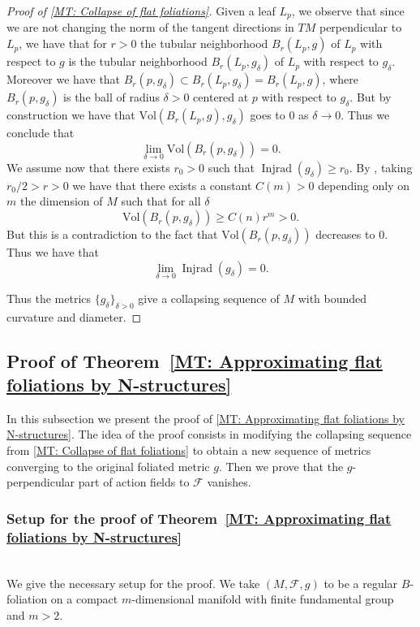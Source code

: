 \documentclass[12pt,a4paper,reqno]{amsart}
\theoremstyle{definition}
\numberwithin{equation}{section}
\newcommand{\fol}{\mathcal{F}}
\DeclareMathOperator{\Inj}{Injrad}
\begin{document}
\begin{proof}[Proof of \th\ref{MT: Collapse of flat foliations}]
Given a leaf $L_p$, we observe that since we are not changing the norm of the tangent directions in $TM$ perpendicular to $L_p$, we have that for $r>0$ the tubular neighborhood $B_{r}(L_p,g)$ of $L_p$ with respect to $g$ is the tubular neighborhood $B_{r}(L_p,g_\delta)$ of $L_p$ with respect to $g_\delta$. Moreover we have that  $B_{r}(p,g_\delta)\subset B_{r}(L_p,g_\delta)= B_{r}(L_p,g)$, where $B_{r}(p,g_\delta)$ is the ball of radius $\delta>0$ centered at $p$ with respect to $g_\delta$. But by construction we have that $\mathrm{Vol}(B_{r}(L_p,g), g_\delta)$ goes to $0$ as $\delta\to 0$. Thus we conclude that 
\[
\lim_{\delta\to 0}\mathrm{Vol}(B_{r}(p,g_\delta)) =0.
\]
We assume now that there exists $r_0>0$ such that $\Inj(g_\delta)\geq r_0$. By \cite[Proposition 14]{Croke1980}, taking $r_0/2>r>0$ we have that there exists a constant $C(m)>0$ depending only on $m$ the dimension of $M$ such that for all $\delta$
\[
\mathrm{Vol}(B_{r}(p,g_\delta))\geq C(n) r^m>0.
\] 
But this is a contradiction to the fact that $\mathrm{Vol}(B_{r}(p,g_\delta))$ decreases to $0$. Thus  we have that 
\[
\lim_{\delta\to 0} \Inj(g_\delta)=0.
\]

Thus the metrics $\{g_\delta\}_{\delta>0}$ give a collapsing sequence of $M$ with bounded curvature and diameter.
\end{proof}

\subsection{Proof of Theorem~\ref{MT: Approximating flat foliations by N-structures}}\label{SS: Proof of approximation by N-structures}

In this subsection we present the proof of \th\ref{MT: Approximating flat foliations by N-structures}. The idea of the proof consists in modifying the collapsing sequence from \th\ref{MT: Collapse of flat foliations} to obtain a new sequence of metrics converging to the original foliated metric $g$. Then we prove that the $g$-perpendicular part of action fields to $\fol$ vanishes.

\subsubsection*{Setup for the proof of Theorem~\ref{MT: Approximating flat foliations by N-structures}}\hfill\\
We give the necessary setup for the proof. We take  $(M,\fol,g)$ to be a regular $B$-foliation on a compact $m$-dimensional manifold with finite fundamental group and  $m>2$.  
\end{document}

